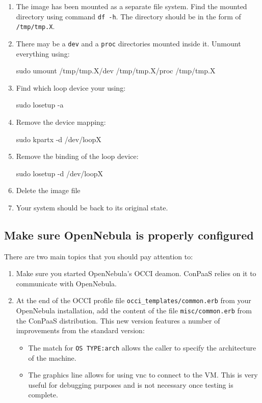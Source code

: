 \documentclass[10pt]{article}
\begin{document}
\begin{enumerate}
\item The image has been mounted as a separate file system. Find the
  mounted directory using command \verb+df -h+. The directory should
  be in the form of \verb+/tmp/tmp.X+.
  
\item There may be a \verb+dev+ and a \verb+proc+ directories mounted
  inside it. Unmount everything using:
  \begin{code}
    sudo umount /tmp/tmp.X/dev /tmp/tmp.X/proc /tmp/tmp.X
  \end{code}
  
\item Find which loop device your using:
  \begin{code}
    sudo losetup -a
  \end{code}
  
\item Remove the device mapping:
  \begin{code}
    sudo kpartx -d /dev/loopX
  \end{code}
  
\item Remove the binding of the loop device:
  \begin{code}
    sudo losetup -d /dev/loopX
  \end{code}

\item Delete the image file 

\item Your system should be back to its original state.
\end{enumerate}

\subsection{Make sure OpenNebula is properly configured}

There are two main topics that you should pay attention to:

\begin{enumerate}
\item Make sure you started OpenNebula's OCCI deamon. ConPaaS relies
  on it to communicate with OpenNebula.

\item At the end of the OCCI profile file \verb+occi_templates/common.erb+ 
  from your OpenNebula installation, add the content of the file
  \verb+misc/common.erb+ from the ConPaaS distribution. This new version 
  features a number of improvements from the standard version:
  \begin{itemize}
  \item The match for \verb+OS TYPE:arch+ allows the caller to specify
    the architecture of the machine.
  \item The graphics line allows for using vnc to connect to the VM.
    This is very useful for debugging purposes and is not necessary
    once testing is complete.
  \end{itemize}
\end{enumerate}
\end{document}
